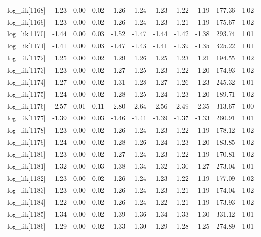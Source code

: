 \begin{table}[ht]
\begin{tabular}{rrrrrrrrrrr}
  log\_lik[1168] & -1.23 & 0.00 & 0.02 & -1.26 & -1.24 & -1.23 & -1.22 & -1.19 & 177.36 & 1.02 \\ 
  log\_lik[1169] & -1.23 & 0.00 & 0.02 & -1.26 & -1.24 & -1.23 & -1.21 & -1.19 & 175.67 & 1.02 \\ 
  log\_lik[1170] & -1.44 & 0.00 & 0.03 & -1.52 & -1.47 & -1.44 & -1.42 & -1.38 & 293.74 & 1.01 \\ 
  log\_lik[1171] & -1.41 & 0.00 & 0.03 & -1.47 & -1.43 & -1.41 & -1.39 & -1.35 & 325.22 & 1.01 \\ 
  log\_lik[1172] & -1.25 & 0.00 & 0.02 & -1.29 & -1.26 & -1.25 & -1.23 & -1.21 & 194.55 & 1.02 \\ 
  log\_lik[1173] & -1.23 & 0.00 & 0.02 & -1.27 & -1.25 & -1.23 & -1.22 & -1.20 & 174.93 & 1.02 \\ 
  log\_lik[1174] & -1.27 & 0.00 & 0.02 & -1.31 & -1.28 & -1.27 & -1.26 & -1.23 & 245.32 & 1.01 \\ 
  log\_lik[1175] & -1.24 & 0.00 & 0.02 & -1.28 & -1.25 & -1.24 & -1.23 & -1.20 & 189.71 & 1.02 \\ 
  log\_lik[1176] & -2.57 & 0.01 & 0.11 & -2.80 & -2.64 & -2.56 & -2.49 & -2.35 & 313.67 & 1.00 \\ 
  log\_lik[1177] & -1.39 & 0.00 & 0.03 & -1.46 & -1.41 & -1.39 & -1.37 & -1.33 & 260.91 & 1.01 \\ 
  log\_lik[1178] & -1.23 & 0.00 & 0.02 & -1.26 & -1.24 & -1.23 & -1.22 & -1.19 & 178.12 & 1.02 \\ 
  log\_lik[1179] & -1.24 & 0.00 & 0.02 & -1.28 & -1.26 & -1.24 & -1.23 & -1.20 & 183.85 & 1.02 \\ 
  log\_lik[1180] & -1.23 & 0.00 & 0.02 & -1.27 & -1.24 & -1.23 & -1.22 & -1.19 & 170.81 & 1.02 \\ 
  log\_lik[1181] & -1.32 & 0.00 & 0.03 & -1.38 & -1.34 & -1.32 & -1.30 & -1.27 & 273.04 & 1.01 \\ 
  log\_lik[1182] & -1.23 & 0.00 & 0.02 & -1.26 & -1.24 & -1.23 & -1.22 & -1.19 & 177.09 & 1.02 \\ 
  log\_lik[1183] & -1.23 & 0.00 & 0.02 & -1.26 & -1.24 & -1.23 & -1.21 & -1.19 & 174.04 & 1.02 \\ 
  log\_lik[1184] & -1.22 & 0.00 & 0.02 & -1.26 & -1.24 & -1.22 & -1.21 & -1.19 & 173.93 & 1.02 \\ 
  log\_lik[1185] & -1.34 & 0.00 & 0.02 & -1.39 & -1.36 & -1.34 & -1.33 & -1.30 & 331.12 & 1.01 \\ 
  log\_lik[1186] & -1.29 & 0.00 & 0.02 & -1.33 & -1.30 & -1.29 & -1.28 & -1.25 & 274.89 & 1.01 \\ 

\end{tabular}
\end{table}
